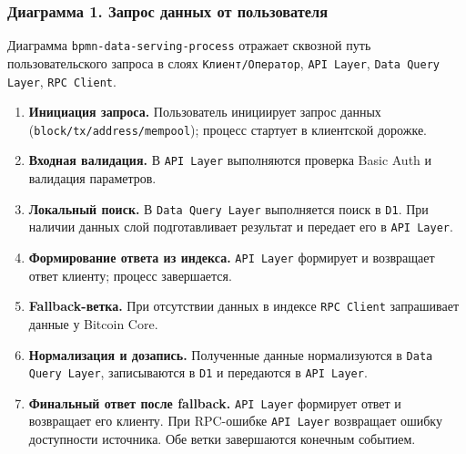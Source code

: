 ﻿\documentclass[14pt,a4paper]{extarticle}
\begin{document}
\subsubsection{Диаграмма 1. Запрос данных от пользователя}
\noindent Диаграмма \texttt{bpmn-data-serving-process} отражает сквозной путь пользовательского запроса в слоях \texttt{Клиент/Оператор}, \texttt{API Layer}, \texttt{Data Query Layer}, \texttt{RPC Client}.
\begin{enumerate}
  \item \textbf{Инициация запроса.} Пользователь инициирует запрос данных (\texttt{block/tx/address/mempool}); процесс стартует в клиентской дорожке.
  \item \textbf{Входная валидация.} В \texttt{API Layer} выполняются проверка Basic Auth и валидация параметров.
  \item \textbf{Локальный поиск.} В \texttt{Data Query Layer} выполняется поиск в \texttt{D1}. При наличии данных слой подготавливает результат и передает его в \texttt{API Layer}.
  \item \textbf{Формирование ответа из индекса.} \texttt{API Layer} формирует и возвращает ответ клиенту; процесс завершается.
  \item \textbf{Fallback-ветка.} При отсутствии данных в индексе \texttt{RPC Client} запрашивает данные у Bitcoin Core.
  \item \textbf{Нормализация и дозапись.} Полученные данные нормализуются в \texttt{Data Query Layer}, записываются в \texttt{D1} и передаются в \texttt{API Layer}.
  \item \textbf{Финальный ответ после fallback.} \texttt{API Layer} формирует ответ и возвращает его клиенту. При RPC-ошибке \texttt{API Layer} возвращает ошибку доступности источника. Обе ветки завершаются конечным событием.
\end{enumerate}
\end{document}
